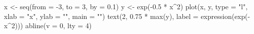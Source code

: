 \begin{Schunk}
\begin{Sinput}
 x <- seq(from = -3, to = 3, by = 0.1)
 y <- exp(-0.5 * x^2)
 plot(x, y, type = "l", xlab = "x", ylab = "", main = "")
 text(2, 0.75 * max(y), label = expression(exp(-x^2)))
 abline(v = 0, lty = 4)
\end{Sinput}
\end{Schunk}
